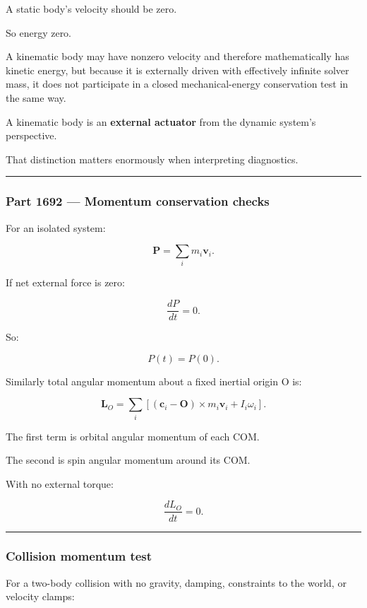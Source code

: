 A static body's velocity should be zero.

So energy zero.

A kinematic body may have nonzero velocity and therefore mathematically has kinetic energy, but because it is externally driven with effectively infinite solver mass, it does not participate in a closed mechanical-energy conservation test in the same way.

A kinematic body is an \textbf{external actuator} from the dynamic system's perspective.

That distinction matters enormously when interpreting diagnostics.

\begin{center}\rule{0.5\linewidth}{0.5pt}\end{center}

\subsubsection{Part 1692 --- Momentum conservation checks}\label{part-1692-momentum-conservation-checks}

For an isolated system:

\[
\boxed{
\mathbf P
=
\sum_i
m_i\mathbf v_i.
}
\]

If net external force is zero:

\[
\frac{dP}{dt}=0.
\]

So:

\[
P(t)=P(0).
\]

Similarly total angular momentum about a fixed inertial origin O is:

\[
\boxed{
\mathbf L_O
=
\sum_i
[
(\mathbf c_i-\mathbf O)\times m_i\mathbf v_i
+
I_i\omega_i
].
}
\]

The first term is orbital angular momentum of each COM.

The second is spin angular momentum around its COM.

With no external torque:

\[
\frac{dL_O}{dt}=0.
\]

\begin{center}\rule{0.5\linewidth}{0.5pt}\end{center}

\subsubsection{Collision momentum test}\label{collision-momentum-test}

For a two-body collision with no gravity, damping, constraints to the world, or velocity clamps:

